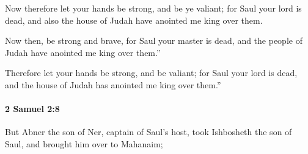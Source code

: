 			\begin{versebox}
					\item[BHS] 
					\item[ASV] Now therefore let your hands be strong, and be ye valiant; for Saul your lord is dead, and also the house of Judah have anointed me king over them.
					\item[NIV] Now then, be strong and brave, for Saul your master is dead, and the people of Judah have anointed me king over them.”
					\item[NRSV] Therefore let your hands be strong, and be valiant; for Saul your lord is dead, and the house of Judah has anointed me king over them.”
			\end{versebox}

		\paragraph{2 Samuel 2:8} %
			\label{2SAMUEL-2-8}

			But Abner the son of Ner, captain of Saul’s host, took Ishbosheth the son of Saul, and brought him over to Mahanaim;

